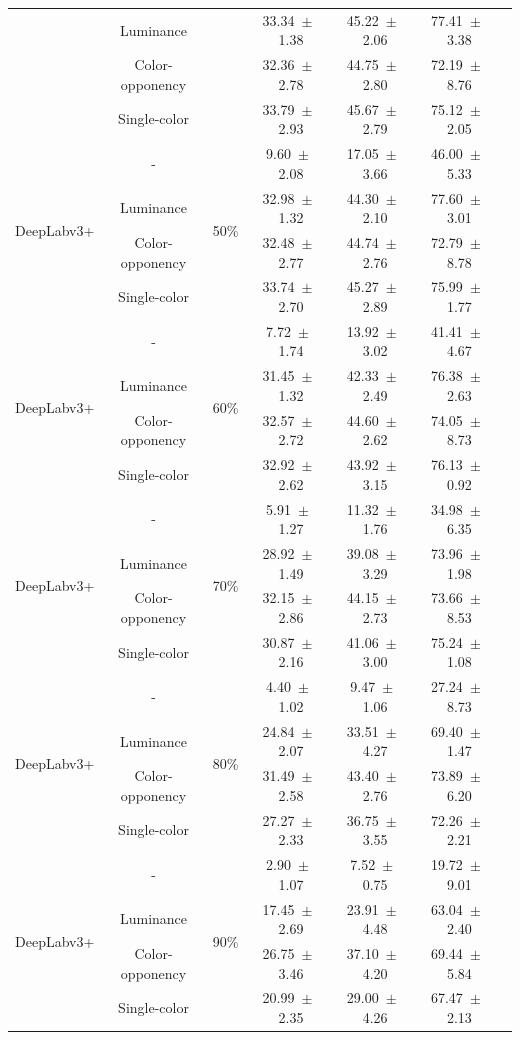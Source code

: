 \begin{table}[h]
\begin{tabular}{@{}lccc ccc@{}}
& Luminance & & 33.34~$\pm$~1.38 & 45.22~$\pm$~2.06 & 77.41~$\pm$~3.38 \\
& Color-opponency & & 32.36~$\pm$~2.78 & 44.75~$\pm$~2.80 & 72.19~$\pm$~8.76 \\
& Single-color & & 33.79~$\pm$~2.93 & 45.67~$\pm$~2.79 & 75.12~$\pm$~2.05 \\
\midrule
\multirow{4}{*}{DeepLabv3+} & - & \multirow{4}{*}{50\%} & 9.60~$\pm$~2.08 & 17.05~$\pm$~3.66 & 46.00~$\pm$~5.33 \\
& Luminance & & 32.98~$\pm$~1.32 & 44.30~$\pm$~2.10 & 77.60~$\pm$~3.01 \\
& Color-opponency & & 32.48~$\pm$~2.77 & 44.74~$\pm$~2.76 & 72.79~$\pm$~8.78 \\
& Single-color & & 33.74~$\pm$~2.70 & 45.27~$\pm$~2.89 & 75.99~$\pm$~1.77 \\
\midrule
\multirow{4}{*}{DeepLabv3+} & - & \multirow{4}{*}{60\%} & 7.72~$\pm$~1.74 & 13.92~$\pm$~3.02 & 41.41~$\pm$~4.67 \\
& Luminance & & 31.45~$\pm$~1.32 & 42.33~$\pm$~2.49 & 76.38~$\pm$~2.63 \\
& Color-opponency & & 32.57~$\pm$~2.72 & 44.60~$\pm$~2.62 & 74.05~$\pm$~8.73 \\
& Single-color & & 32.92~$\pm$~2.62 & 43.92~$\pm$~3.15 & 76.13~$\pm$~0.92 \\
\midrule
\multirow{4}{*}{DeepLabv3+} & - & \multirow{4}{*}{70\%} & 5.91~$\pm$~1.27 & 11.32~$\pm$~1.76 & 34.98~$\pm$~6.35 \\
& Luminance & & 28.92~$\pm$~1.49 & 39.08~$\pm$~3.29 & 73.96~$\pm$~1.98 \\
& Color-opponency & & 32.15~$\pm$~2.86 & 44.15~$\pm$~2.73 & 73.66~$\pm$~8.53 \\
& Single-color & & 30.87~$\pm$~2.16 & 41.06~$\pm$~3.00 & 75.24~$\pm$~1.08 \\
\midrule
\multirow{4}{*}{DeepLabv3+} & - & \multirow{4}{*}{80\%} & 4.40~$\pm$~1.02 & 9.47~$\pm$~1.06 & 27.24~$\pm$~8.73 \\
& Luminance & & 24.84~$\pm$~2.07 & 33.51~$\pm$~4.27 & 69.40~$\pm$~1.47 \\
& Color-opponency & & 31.49~$\pm$~2.58 & 43.40~$\pm$~2.76 & 73.89~$\pm$~6.20 \\
& Single-color & & 27.27~$\pm$~2.33 & 36.75~$\pm$~3.55 & 72.26~$\pm$~2.21 \\
\midrule
\multirow{4}{*}{DeepLabv3+} & - & \multirow{4}{*}{90\%} & 2.90~$\pm$~1.07 & 7.52~$\pm$~0.75 & 19.72~$\pm$~9.01 \\
& Luminance & & 17.45~$\pm$~2.69 & 23.91~$\pm$~4.48 & 63.04~$\pm$~2.40 \\
& Color-opponency & & 26.75~$\pm$~3.46 & 37.10~$\pm$~4.20 & 69.44~$\pm$~5.84 \\
& Single-color & & 20.99~$\pm$~2.35 & 29.00~$\pm$~4.26 & 67.47~$\pm$~2.13 \\
\midrule
\bottomrule
\end{tabular}
\label{tab:sparse_results_deeplabv3plus_acdc_snow}
\end{table}